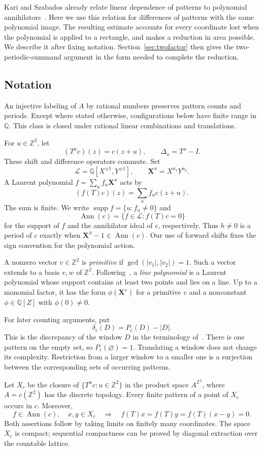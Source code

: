\documentclass[11pt,a4paper,reqno]{amsart}
\theoremstyle{remark}
\newcommand{\Z}{\mathbb Z}
\newcommand{\Q}{\mathbb Q}
\newcommand{\LL}{\mathcal L}
\newcommand{\mon}[1]{\boldsymbol X^{#1}}
\newcommand{\De}{\Delta}
\DeclareMathOperator{\Ann}{Ann}
\DeclareMathOperator{\supp}{supp}
\numberwithin{equation}{section}
\begin{document}
Kari and Szabados already relate linear dependence of patterns to polynomial annihilators~\cite[proofs of Lemmas~6 and~32]{KS}. Here we use this relation for differences of patterns with the same polynomial image. The resulting estimate accounts for every coordinate lost when the polynomial is applied to a rectangle, and makes a reduction in area possible. We describe it after fixing notation. Section~\ref{sec:twofactor} then gives the two-periodic-summand argument in the form needed to complete the reduction.

\subsection{Notation}
An injective labeling of $A$ by rational numbers preserves pattern counts and periods. Except where stated otherwise, configurations below have finite range in $\Q$. This class is closed under rational linear combinations and translations.

For $u\in\Z^2$, let
\[
 (T^u c)(z)=c(z+u),\qquad \De_u=T^u-I.
\]
These shift and difference operators commute. Set
\[
 \LL=\Q[X^{\pm1},Y^{\pm1}],\qquad
 \mon u=X^{u_1}Y^{u_2}.
\]
A Laurent polynomial $f=\sum_u f_u\mon u$ acts by
\[
 (f(T)c)(z)=\sum_u f_uc(z+u).
\]
The sum is finite. We write $\supp f=\{u:f_u\ne0\}$ and
\[
 \Ann(c)=\{f\in\LL:f(T)c=0\}
\]
for the support of $f$ and the annihilator ideal of $c$, respectively. Thus $h\ne0$ is a period of $c$ exactly when $\mon h-1\in\Ann(c)$. Our use of forward shifts fixes the sign convention for the polynomial action.

A nonzero vector $v\in\Z^2$ is \emph{primitive} if $\gcd(|v_1|,|v_2|)=1$. Such a vector extends to a basis $v,w$ of $\Z^2$. Following~\cite{KS}, a \emph{line polynomial} is a Laurent polynomial whose support contains at least two points and lies on a line. Up to a monomial factor, it has the form $\phi(\mon v)$ for a primitive $v$ and a nonconstant $\phi\in\Q[Z]$ with $\phi(0)\ne0$.

For later counting arguments, put
\[
 \delta_c(D)=P_c(D)-|D|.
\]
This is the discrepancy of the window $D$ in the terminology of~\cite[Section~2.2]{CK}. There is one pattern on the empty set, so $P_c(\varnothing)=1$. Translating a window does not change its complexity. Restriction from a larger window to a smaller one is a surjection between the corresponding sets of occurring patterns.

Let $X_c$ be the closure of $\{T^u c:u\in\Z^2\}$ in the product space $A^{\Z^2}$, where $A=c(\Z^2)$ has the discrete topology. Every finite pattern of a point of $X_c$ occurs in $c$. Moreover,
\begin{equation}\label{eq:inheritance}
 f\in\Ann(c),\quad x,y\in X_c
 \quad\Longrightarrow\quad f(T)x=f(T)y=f(T)(x-y)=0.
\end{equation}
Both assertions follow by taking limits on finitely many coordinates. The space $X_c$ is compact; sequential compactness can be proved by diagonal extraction over the countable lattice.
\end{document}
